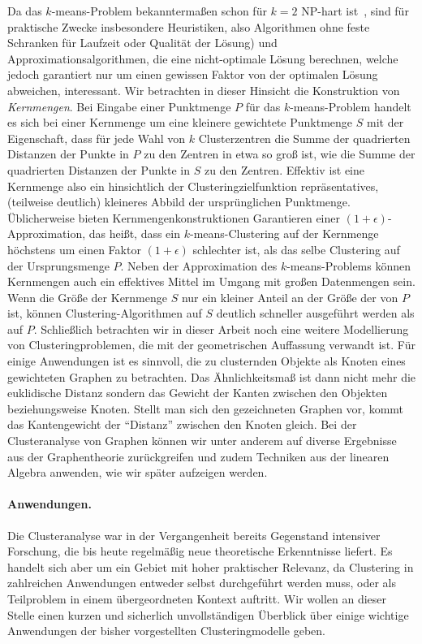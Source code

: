 Da das $k$-means-Problem bekanntermaßen schon für $k = 2$ NP-hart ist~\cite{AloiseDHP09}, sind für praktische Zwecke insbesondere
Heuristiken, also Algorithmen ohne feste Schranken für Laufzeit oder Qualität der Lösung) und
Approximationsalgorithmen, die eine nicht-optimale Lösung berechnen, welche jedoch garantiert nur um einen gewissen
Faktor von der optimalen Lösung abweichen, interessant. Wir betrachten in dieser Hinsicht die Konstruktion von \emph{Kernmengen}.
Bei Eingabe einer Punktmenge $P$ für das $k$-means-Problem handelt es sich bei einer Kernmenge um eine kleinere gewichtete
Punktmenge $S$ mit der Eigenschaft, dass für jede Wahl von $k$ Clusterzentren die Summe der quadrierten Distanzen der Punkte in
$P$ zu den Zentren in etwa so groß ist, wie die Summe der quadrierten Distanzen der Punkte in $S$ zu den Zentren. Effektiv ist
eine Kernmenge also ein hinsichtlich der Clusteringzielfunktion repräsentatives, (teilweise deutlich) kleineres Abbild der
ursprünglichen Punktmenge. Üblicherweise bieten Kernmengenkonstruktionen Garantieren einer $(1 + \epsilon)$-Approximation,
das heißt, dass ein $k$-means-Clustering auf der Kernmenge höchstens um einen Faktor $(1 + \epsilon)$ schlechter ist, als das
selbe Clustering auf der Ursprungsmenge $P$. Neben der Approximation des $k$-means-Problems können Kernmengen auch ein
effektives Mittel im Umgang mit großen Datenmengen sein. Wenn die Größe der Kernmenge $S$ nur ein kleiner Anteil an der Größe der
von $P$ ist, können Clustering-Algorithmen auf $S$ deutlich schneller ausgeführt werden als auf $P$.
\absatz
Schließlich betrachten wir in dieser Arbeit noch eine weitere Modellierung von Clusteringproblemen, die mit der geometrischen
Auffassung verwandt ist. Für einige Anwendungen ist es sinnvoll, die zu clusternden Objekte als Knoten eines gewichteten
Graphen zu betrachten. Das Ähnlichkeitsmaß ist dann nicht mehr die euklidische Distanz sondern das Gewicht der Kanten zwischen
den Objekten beziehungsweise Knoten. Stellt man sich den gezeichneten Graphen vor, kommt das Kantengewicht der "`Distanz"'
zwischen den Knoten gleich. Bei der Clusteranalyse von Graphen können wir unter anderem auf diverse Ergebnisse aus der
Graphentheorie zurückgreifen und zudem Techniken aus der linearen Algebra anwenden, wie wir später aufzeigen werden.

\paragraph{Anwendungen.} Die Clusteranalyse war in der Vergangenheit bereits Gegenstand intensiver Forschung, die bis heute
regelmäßig neue theoretische Erkenntnisse liefert. Es handelt sich aber um ein Gebiet mit hoher praktischer Relevanz, da
Clustering in zahlreichen Anwendungen entweder selbst durchgeführt werden muss, oder als Teilproblem in einem übergeordneten
Kontext auftritt.
Wir wollen an dieser Stelle einen kurzen und sicherlich unvollständigen Überblick über einige wichtige Anwendungen
der bisher vorgestellten Clusteringmodelle geben.

